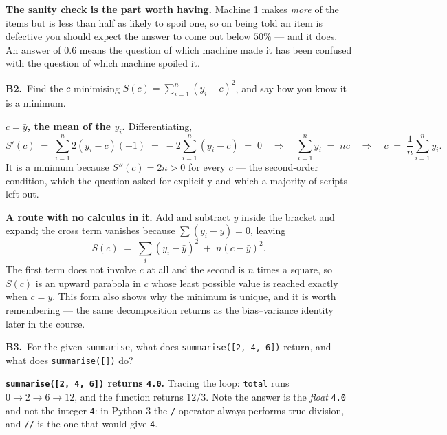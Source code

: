 \documentclass[10pt,a4paper]{article}
\newcommand{\sol}[1]{\textbf{#1}}
\begin{document}
\textbf{The sanity check is the part worth having.} Machine 1 makes \emph{more} of the items but is
less than half as likely to spoil one, so on being told an item is defective you should expect the
answer to come out below $50\%$ --- and it does. An answer of $0.6$ means the question of which
machine made it has been confused with the question of which machine spoiled it.

\vspace{5pt}

\textbf{B2.}\ Find the $c$ minimising $S(c) = \sum_{i=1}^{n}(y_i - c)^2$, and say how you know it is a
minimum.

\vspace{2pt}

\sol{$c = \bar{y}$, the mean of the $y_i$.} Differentiating,
\[
S'(c) \;=\; \sum_{i=1}^{n} 2(y_i - c)(-1) \;=\; -2\sum_{i=1}^{n}(y_i - c) \;=\; 0
\quad\Longrightarrow\quad \sum_{i=1}^{n} y_i \;=\; nc
\quad\Longrightarrow\quad c \;=\; \frac{1}{n}\sum_{i=1}^{n} y_i .
\]
It is a minimum because $S''(c) = 2n > 0$ for every $c$ --- the second-order condition, which the
question asked for explicitly and which a majority of scripts left out.

\textbf{A route with no calculus in it.} Add and subtract $\bar{y}$ inside the bracket and expand; the
cross term vanishes because $\sum (y_i - \bar{y}) = 0$, leaving
\[
S(c) \;=\; \sum_i (y_i - \bar{y})^2 \;+\; n(c - \bar{y})^2 .
\]
The first term does not involve $c$ at all and the second is $n$ times a square, so $S(c)$ is an
upward parabola in $c$ whose least possible value is reached exactly when $c = \bar{y}$. This form
also shows why the minimum is unique, and it is worth remembering --- the same decomposition returns
as the bias--variance identity later in the course.

\vspace{5pt}

\textbf{B3.}\ For the given \texttt{summarise}, what does \texttt{summarise([2, 4, 6])} return, and
what does \texttt{summarise([])} do?

\vspace{2pt}

\sol{\texttt{summarise([2, 4, 6])} returns \texttt{4.0}.} Tracing the loop: \texttt{total} runs
$0 \to 2 \to 6 \to 12$, and the function returns $12 / 3$. Note the answer is the \emph{float}
\texttt{4.0} and not the integer \texttt{4}: in Python 3 the \texttt{/} operator always performs true
division, and \texttt{//} is the one that would give \texttt{4}.
\end{document}
